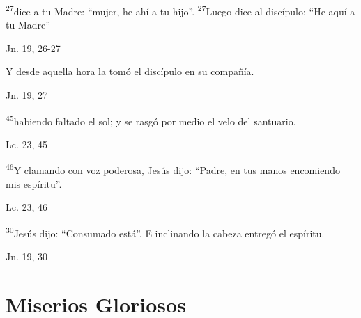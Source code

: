 \documentclass[a4paper,11pt]{article}
\begin{document}
      \textsuperscript{27}dice a tu Madre: ``mujer, he ahí a tu hijo''. \textsuperscript{27}Luego dice al discípulo: ``He aquí a tu Madre''
      \begin{flushright}
        Jn. 19, 26-27
      \end{flushright}

      Y desde aquella hora la tomó el discípulo en su compañía.
      \begin{flushright}
        Jn. 19, 27
      \end{flushright}

      \textsuperscript{45}habiendo faltado el sol; y se rasgó por medio el velo del santuario.
      \begin{flushright}
        Lc. 23, 45
      \end{flushright}

      \textsuperscript{46}Y clamando con voz poderosa, Jesús dijo: ``Padre, en tus manos encomiendo mis espíritu''.
      \begin{flushright}
        Lc. 23, 46 
      \end{flushright}

      \textsuperscript{30}Jesús dijo: ``Consumado está''. E inclinando la cabeza entregó el espíritu.
      \begin{flushright}
        Jn. 19, 30
      \end{flushright}
 
    \newpage
         
  \section*{\hfil Miserios Gloriosos \hfil}
\end{document}
